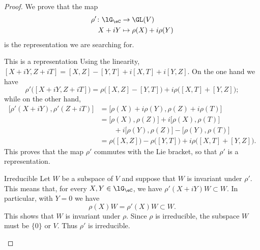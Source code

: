 \begin{proof}
    We prove that the map
    \begin{equation}
        \begin{aligned}
            \rho'\colon \lG_{\eC}&\to \GL(V) \\
            X+iY&\mapsto \rho(X)+i\rho(Y) 
        \end{aligned}
    \end{equation}
    is the representation we are searching for.

    \begin{subproof}
        \item[This is a representation]
            Using the linearity, \( [X+iY,Z+iT]=[X,Z]-[Y,T]+i[X,T]+i[Y,Z]\). On the one hand we have
            \begin{equation}
                \rho'\big( [X+iY,Z+iT] \big)=\rho\big( [X,Z]-[Y,T] \big)+i\rho\big( [X,T]+[Y,Z] \big);
            \end{equation}
            while on the other hand,
            \begin{subequations}
                \begin{align}
                    \big[ \rho'(X+iY),\rho'(Z+iT) \big]&=\big[ \rho(X)+i\rho(Y),\rho(Z)+i\rho(T) \big]\\
                    &=\big[ \rho(X),\rho(Z) \big]+i\big[ \rho(X),\rho(T) \big]\\
                    &\qquad+i\big[ \rho(Y),\rho(Z) \big]-\big[ \rho(Y),\rho(T) \big]\\
                    &=\rho\big( [X,Z] \big)-\rho\big( [Y,T] \big)+i\rho\big( [X,T]+[Y,Z] \big).
                \end{align}
            \end{subequations}
            This proves that the map \( \rho'\) commutes with the Lie bracket, so that \( \rho'\) is a representation.
        \item[Irreducible]
            Let \( W\) be a subspace of \( V\) and suppose that \( W\) is invariant under \( \rho'\). This means that, for every \( X,Y\in \lG_{\eC}\), we have \( \rho'(X+iY)W\subset W\). In particular, with \( Y=0\) we have
            \begin{equation}
                \rho(X)W=\rho'(X)W\subset W.
            \end{equation}
            This shows that \( W\) is invariant under \( \rho\). Since \( \rho\) is irreducible, the subspace \( W\) must be \( \{ 0 \}\) or \( V\). Thus \( \rho'\) is irreducible.
    \end{subproof}
\end{proof}

